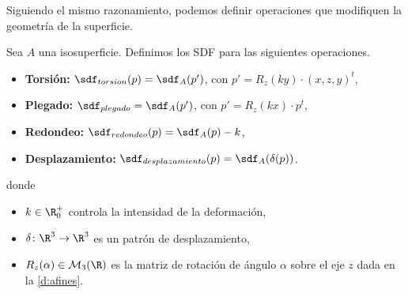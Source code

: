 Siguiendo el mismo razonamiento, podemos definir operaciones que modifiquen la geometría de la superficie.
\begin{definicion}
    Sea $A$ una isosuperficie. Definimos los SDF para las siguientes operaciones.
    \begin{itemize}
        
        \item \textbf{Torsión: } $\sdf_{torsion}(p) = \sdf_{A}(p')$, con $p' = R_z(ky)\cdot (x,z,y)^t$,
        \item \textbf{Plegado: } $\sdf_{plegado} =\sdf_{A}(p')$, con $p' = R_z(kx)\cdot p^t$,
        \item \textbf{Redondeo: } $\sdf_{redondeo}(p) = \sdf_{A}(p) - k$,
        \item \textbf{Desplazamiento: } $\sdf_{desplazamiento}(p) = \sdf_{A}(\delta(p))$.
    \end{itemize}

    donde
    \begin{itemize}
        \item $k\in \R^+_0$ controla la intensidad de la deformación,
        \item $\delta\colon \R^3\to \R^3$ es un patrón de desplazamiento,
        \item $R_z(\alpha)\in \mathcal{M}_3(\R)$ es la matriz de rotación de ángulo $\alpha$ sobre el eje $z$ dada en la \autoref{d:afines}.
    \end{itemize}
\end{definicion}

